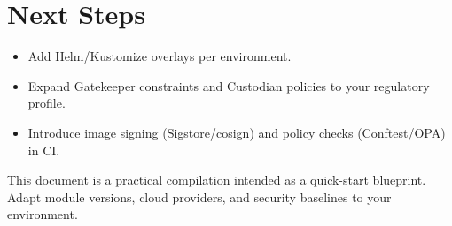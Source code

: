 \documentclass[11pt]{article}
\begin{document}
\section{Next Steps}
\begin{itemize}[leftmargin=2em]
  \item Add Helm/Kustomize overlays per environment.
  \item Expand Gatekeeper constraints and Custodian policies to your regulatory profile.
  \item Introduce image signing (Sigstore/cosign) and policy checks (Conftest/OPA) in CI.
\end{itemize}

\vfill
\noindent\footnotesize This document is a practical compilation intended as a quick-start blueprint. Adapt module versions, cloud providers, and security baselines to your environment.
\end{document}
